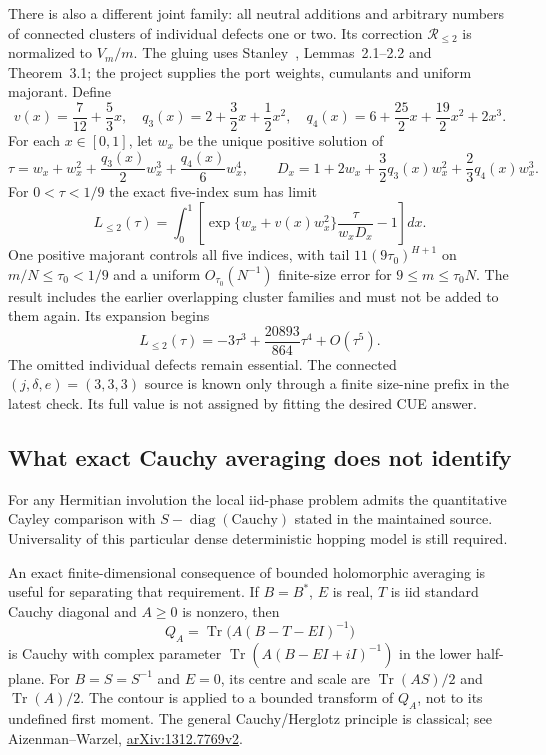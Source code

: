 There is also a different joint family: all neutral additions and arbitrary
numbers of connected clusters of individual defects one or two.  Its
correction $\mathcal R_{\le2}$ is normalized to $V_m/m$. The gluing uses
Stanley~\cite{Stanley1981Cycles}, Lemmas~2.1--2.2 and Theorem~3.1;
the project supplies the port weights, cumulants and uniform majorant. Define
\[
 v(x)=\frac7{12}+\frac53x,\quad
 q_3(x)=2+\frac32x+\frac12x^2,\quad
 q_4(x)=6+\frac{25}2x+\frac{19}2x^2+2x^3.
\]
For each $x\in[0,1]$, let $w_x$ be the unique positive solution of
\[
 \tau=w_x+w_x^2+\frac{q_3(x)}2w_x^3+\frac{q_4(x)}6w_x^4,
 \qquad D_x=1+2w_x+\frac32q_3(x)w_x^2+\frac23q_4(x)w_x^3.
\]
For $0<\tau<1/9$ the exact five-index sum has limit
\[
 L_{\le2}(\tau)=\int_0^1
 \left[\exp\{w_x+v(x)w_x^2\}\frac{\tau}{w_xD_x}-1\right]dx.
\]
One positive majorant controls all five indices, with tail
$11(9\tau_0)^{H+1}$ on $m/N\le\tau_0<1/9$ and a uniform
$O_{\tau_0}(N^{-1})$ finite-size error for $9\le m\le\tau_0N$.
The result includes the earlier overlapping cluster families and must not
be added to them again.  Its expansion begins
\[
 L_{\le2}(\tau)=-3\tau^3+\frac{20893}{864}\tau^4+O(\tau^5).
\]
The omitted individual defects remain essential.  The connected
$(j,\delta,e)=(3,3,3)$ source is known only through a finite size-nine
prefix in the latest check.  Its full value is not assigned by fitting
the desired CUE answer.

\subsection{What exact Cauchy averaging does not identify}

For any Hermitian involution the local iid-phase problem admits the
quantitative Cayley comparison with $S-\operatorname{diag}(\mathrm{Cauchy})$
stated in the maintained source.  Universality of this particular dense
deterministic hopping model is still required.

An exact finite-dimensional consequence of bounded holomorphic averaging
is useful for separating that requirement.  If $B=B^*$, $E$ is real,
$T$ is iid standard Cauchy diagonal and $A\ge0$ is nonzero, then
\[
 Q_A=\operatorname{Tr}\bigl(A(B-T-EI)^{-1}\bigr)
\]
is Cauchy with complex parameter
$\operatorname{Tr}(A(B-EI+iI)^{-1})$ in the lower half-plane.
For $B=S=S^{-1}$ and $E=0$, its centre and scale are
$\operatorname{Tr}(AS)/2$ and $\operatorname{Tr}(A)/2$.
The contour is applied to a bounded transform of $Q_A$, not to its
undefined first moment.  The general Cauchy/Herglotz principle is
classical; see Aizenman--Warzel,
\href{https://arxiv.org/abs/1312.7769}{arXiv:1312.7769v2}.

